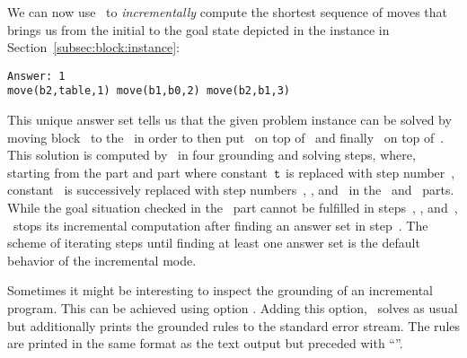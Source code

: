 We can now use \clingo\ to \emph{incrementally} compute the shortest
sequence of moves that brings us from the initial to the goal state
depicted in the instance in Section~\ref{subsec:block:instance}:%
%
\begin{lstlisting}[numbers=none]
Answer: 1
move(b2,table,1) move(b1,b0,2) move(b2,b1,3)
\end{lstlisting}
%
This unique answer set tells us
that the given problem instance can be solved by moving block~ to the~
in order to then put~ on top of~ and finally~ on top of~.
This solution is computed by \clingo\ in four grounding and solving steps,
where, starting from the  part and  part where constant~$\texttt{t}$ is replaced with step number~, 
constant~ is successively replaced with step numbers~, , and~ in the~ and~ parts.
While the goal situation checked in the~ part cannot be fulfilled in steps~, , and~,
\clingo\ stops its incremental computation after finding an answer set in step~.
The scheme of iterating steps until finding at least one answer set is the default behavior of the incremental mode.

Sometimes it might be interesting to inspect the grounding of an incremental program.
This can be achieved using option .
Adding this option, \clingo\ solves as usual
but additionally prints the grounded rules to the standard error stream.
The rules are printed in the same format as the text output but preceded with ``\code{\%}''.

